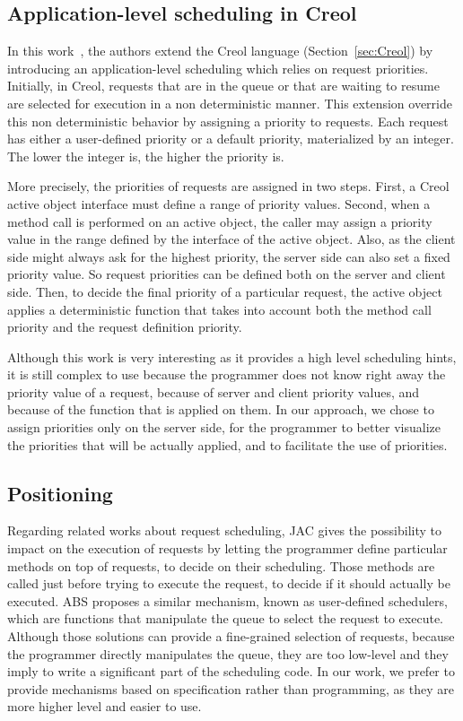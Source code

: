 \documentclass[11pt]{report}
\begin{document}
\subsection{Application-level scheduling in Creol}
In this work~\cite{ref:Nobakht:2012:PDA:2245276.2232086}, the authors extend the Creol  language (Section~\ref{sec:Creol}) by introducing an application-level scheduling which relies on request priorities. Initially, in Creol, requests that are in the queue or that are waiting to resume are selected for execution in a non deterministic manner. This extension override this non deterministic behavior by assigning a priority to requests. Each request has either a user-defined priority or a default priority, materialized by an integer. The lower the integer is, the higher the priority is. 

More precisely, the priorities of requests are assigned in two steps. First, a Creol active object interface must define a range of priority values. Second, when a method call is performed on an active object, the caller may assign a priority value in the range defined by the interface of the active object. Also, as the client side might always ask for the highest priority, the server side can also set a fixed priority value. So request priorities can be defined both on the server and client side. Then, to decide the final priority of a particular request, the active object applies a deterministic function that takes into account both the method call priority and the request definition priority.

Although this work is very interesting as it provides a high level scheduling hints, it is still complex to use because the programmer does not know right away the priority value of a request, because of server and client priority values, and because of the function that is applied on them. In our approach, we chose to assign priorities only on the server side, for the programmer to better visualize the priorities that will be actually applied, and to facilitate the use of priorities. 


\subsection{Positioning}
Regarding related works about request scheduling, JAC gives the possibility to impact on the execution of requests by letting the programmer define particular methods on top of requests, to decide on their scheduling. Those methods are called just before trying to execute the request, to decide if it should actually be executed. ABS proposes a similar mechanism, known as user-defined schedulers, which are functions that manipulate the queue to select the request to execute. Although those solutions can provide a fine-grained selection of requests, because the programmer directly manipulates the queue, they are too low-level and they imply to write a significant part of the scheduling code. In our work, we prefer to provide mechanisms based on specification rather than programming, as they are more higher level and easier to use. 
\end{document}
